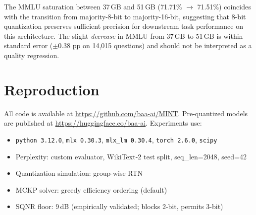 \documentclass{article}
\begin{document}
The MMLU saturation between 37\,GB and 51\,GB (71.71\% $\rightarrow$ 71.51\%) coincides with the transition from majority-8-bit to majority-16-bit, suggesting that 8-bit quantization preserves sufficient precision for downstream task performance on this architecture. The slight \emph{decrease} in MMLU from 37\,GB to 51\,GB is within standard error ($\pm$0.38 pp on 14{,}015 questions) and should not be interpreted as a quality regression.

\section{Reproduction}
\label{app:reproduction}

All code is available at \url{https://github.com/baa-ai/MINT}. Pre-quantized models are published at \url{https://huggingface.co/baa-ai}. Experiments use:
\begin{itemize}
    \item \texttt{python 3.12.0}, \texttt{mlx 0.30.3}, \texttt{mlx\_lm 0.30.4}, \texttt{torch 2.6.0}, \texttt{scipy}
    \item Perplexity: custom evaluator, WikiText-2 test split, seq\_len=2048, seed=42
    \item Quantization simulation: group-wise RTN
    \item MCKP solver: greedy efficiency ordering (default)
    \item SQNR floor: 9\,dB (empirically validated; blocks 2-bit, permits 3-bit)
\end{itemize}
\end{document}
